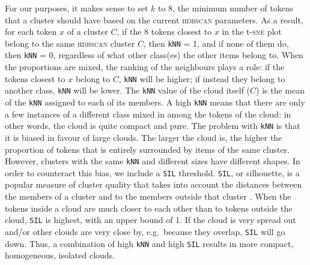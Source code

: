 \documentclass[
]{book}
\begin{document}
For our purposes, it makes sense to set \(k\) to 8, the minimum number of tokens that a cluster should have based on the current \textsc{hdbscan} parameters. As a result, for each token \(x\) of a cluster \(C\), if the 8 tokens closest to \(x\) in the t-\textsc{sne} plot belong to the same \textsc{hdbscan} cluster \(C\), then \texttt{kNN} = 1, and if none of them do, then \texttt{kNN} = 0, regardless of what other class(es) the other items belong to. When the proportions are mixed, the ranking of the neighbours plays a role: if the tokens closest to \(x\) belong to \(C\), \texttt{kNN} will be higher; if instead they belong to another class, \texttt{kNN} will be lower. The \texttt{kNN} value of the cloud itself (\(C\)) is the mean of the \texttt{kNN} assigned to each of its members. A high \texttt{kNN} means that there are only a few instances of a different class mixed in among the tokens of the cloud: in other words, the cloud is quite compact and pure.
The problem with \texttt{kNN} is that it is biased in favour of large clouds. The larger the cloud is, the higher the proportion of tokens that is entirely surrounded by items of the same cluster. However, clusters with the same \texttt{kNN} and different sizes have different shapes. In order to counteract this bias, we include a \texttt{SIL} threshold.
\texttt{SIL}, or silhouette, is a popular measure of cluster quality that takes into account the distances between the members of a cluster and to the members outside that cluster \autocite{rousseeuw_1987}. When the tokens inside a cloud are much closer to each other than to tokens outside the cloud, \texttt{SIL} is highest, with an upper bound of 1. If the cloud is very spread out and/or other clouds are very close by, e.g.~because they overlap, \texttt{SIL} will go down. Thus, a combination of high \texttt{kNN} and high \texttt{SIL} results in more compact, homogeneous, isolated clouds.
\end{document}
